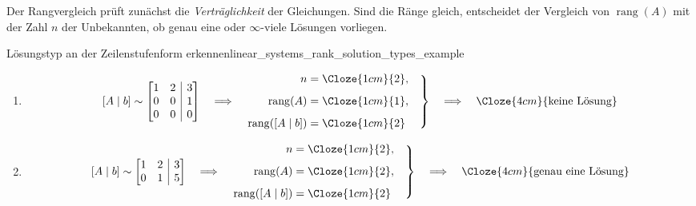 Der Rangvergleich prüft zunächst die \emph{Verträglichkeit}
 der Gleichungen. Sind die Ränge gleich, entscheidet
der Vergleich von $\operatorname{rang}(A)$ mit der Zahl $n$ der Unbekannten,
ob genau eine oder $\infty$-viele Lösungen vorliegen.

\clearpage
\begin{ExampleBox}{Lösungstyp an der Zeilenstufenform erkennen}{linear_systems_rank_solution_types_example}
  \begin{enumerate}[label=\alph*),leftmargin=1.8em,itemsep=1.3em]
    \item
      \[
        [A\mid b]\sim
        \left[
          \begin{array}{@{}rr|r@{}}
            1&2&3\\
            0&0&1\\
            0&0&0
          \end{array}
        \right]
        \quad\Longrightarrow\quad
        \left.
        \begin{aligned}
          n&=\Cloze{1cm}{2},\\[0.5em]
          \operatorname{rang}(A)&=\Cloze{1cm}{1},\\[0.5em]
          \operatorname{rang}([A\mid b])&=\Cloze{1cm}{2}
        \end{aligned}
        \quad\right\}
        \quad\Longrightarrow\quad
        \Cloze{4cm}{\text{keine Lösung}}
      \]

    \item
      \[
        [A\mid b]\sim
        \left[
          \begin{array}{@{}rr|r@{}}
            1&2&3\\
            0&1&5
          \end{array}
        \right]
        \quad\Longrightarrow\quad
        \left.
        \begin{aligned}
          n&=\Cloze{1cm}{2},\\[0.5em]
          \operatorname{rang}(A)&=\Cloze{1cm}{2},\\[0.5em]
          \operatorname{rang}([A\mid b])&=\Cloze{1cm}{2}
        \end{aligned}
        \quad\right\}
        \quad\Longrightarrow\quad
        \Cloze{4cm}{\text{genau eine Lösung}}
      \]


\end{enumerate}
\end{ExampleBox}
